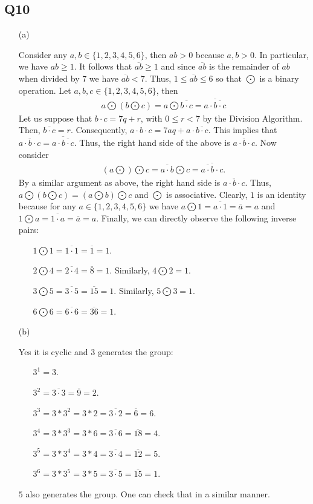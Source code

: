 \documentclass[12pt]{article}
\numberwithin{theorem}{section}
\numberwithin{equation}{section}
\numberwithin{remark}{section}
\numberwithin{definition}{section}
\numberwithin{theorem}{section}
\numberwithin{lemma}{section}
\numberwithin{example}{section}
\begin{document}
\subsection{Q10}

\begin{itemize}
	\item[(a)]{Consider any $a,b\in\{1,2,3,4,5,6\}$, then $ab>0$ because $a,b>0$. In particular, we have $ab\ge1$. It follows that $\overline{ab}\ge1$ and since $\overline{ab}$ is the remainder of $ab$ when divided by $7$ we have $\overline{ab}<7$. Thus, $1\le\overline{ab}\le6$ so that $\bigodot$ is a binary operation. Let $a,b,c\in\{1,2,3,4,5,6\}$, then
		\begin{align*}
			a\bigodot(b\bigodot c)=a\bigodot\overline{b\cdot c}=\overline{a\cdot\overline{b\cdot c}}
		\end{align*}
	Let us suppose that $b\cdot c = 7q+r$, with $0\le r < 7$ by the Division Algorithm. Then, $\overline{b\cdot c}=r$. Consequently, $a\cdot b\cdot c = 7aq+a\cdot\overline{b\cdot c}$. This implies that $\overline{a\cdot b \cdot c}=\overline{a\cdot\overline{b\cdot c}}$. Thus, the right hand side of the above is $\overline{a\cdot b \cdot c}$. Now consider
		\begin{align*}
			(a\bigodot )\bigodot c=\overline{a\cdot b}\bigodot c=\overline{\overline{a\cdot b}\cdot c}.
		\end{align*}
	By a similar argument as above, the right hand side is $\overline{a\cdot b \cdot c}$. Thus, $a\bigodot(b\bigodot c)=(a\bigodot b)\bigodot c$ and $\bigodot$ is associative. Clearly, $1$ is an identity because for any $a\in\{1,2,3,4,5,6\}$ we have $a\bigodot1=\overline{a\cdot 1}=\overline{a}=a$ and $1\bigodot a=\overline{1\cdot a}=\overline{a}=a$. Finally, we can directly observe the following inverse pairs:
		\begin{itemize}
			\item[]{$1\bigodot1=\overline{1\cdot1}=\overline{1}=1$.}
			\item[]{$2\bigodot4=\overline{2\cdot4}=\overline{8}=1$. Similarly, $4\bigodot2=1$.}
			\item[]{$3\bigodot5=\overline{3\cdot5}=\overline{15}=1$. Similarly, $5\bigodot3=1$.}
			\item[]{$6\bigodot6=\overline{6\cdot6}=\overline{36}=1$.}
		\end{itemize}
	}
	\item[(b)]{Yes it is cyclic and $3$ generates the group:
		\begin{itemize}
			\item[]{$3^1=3$.}
			\item[]{$3^2=\overline{3\cdot3}=\overline{9}=2$.}
			\item[]{$3^3=3*3^2=3*2=\overline{3\cdot2}=\overline{6}=6$.}
			\item[]{$3^4=3*3^3=3*6=\overline{3\cdot6}=\overline{18}=4$.}
			\item[]{$3^5=3*3^4=3*4=\overline{3\cdot4}=\overline{12}=5$.}
			\item[]{$3^6=3*3^5=3*5=\overline{3\cdot5}=\overline{15}=1$.}
		\end{itemize}
	$5$ also generates the group. One can check that in a similar manner.}
\end{itemize}
\end{document}

